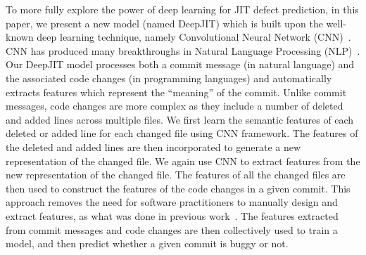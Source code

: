 To more fully explore the power of deep learning for JIT defect prediction, in this paper, we present a new model (named DeepJIT) which is built upon the well-known deep learning technique, namely Convolutional Neural Network (CNN)~\cite{lecun2015deep}. CNN has produced many breakthroughs in Natural Language Processing (NLP)~\cite{kim2014convolutional, dos2014deep, kalchbrenner2014convolutional, zhang2015character, johnson2014effective}.   
Our DeepJIT model processes both a commit message (in natural language) and the associated code changes (in programming languages) and automatically extracts features which represent the ``meaning'' of the commit. Unlike commit messages, code changes are more complex as they include a number of deleted and added lines across multiple files. We first learn the semantic features of each deleted or added line for each changed file using CNN framework. The features of the deleted and added lines are then incorporated to generate a new representation of the changed file. We again use CNN to extract features from the new representation of the changed file. The features of all the changed files are then used to construct the features of the code changes in a given commit. This approach removes the need for software practitioners to manually design and extract features, as what was done in previous work~\cite{mcintosh2018fix}. The features extracted from commit messages and code changes are then collectively used to train a model, and then predict whether a given commit is buggy or not. 


